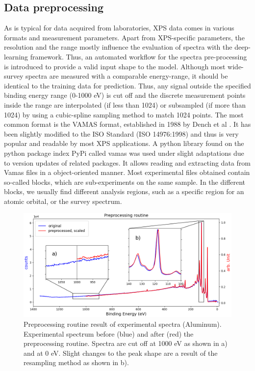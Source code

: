 \subsection{Data preprocessing}

As is typical for data acquired from laboratories, XPS data comes in various formats and measurement parameters. Apart from XPS-specific parameters, the resolution and the range mostly influence the evaluation of spectra with the deep-learning framework. Thus, an automated workflow for the spectra pre-processing is introduced to provide a valid input shape to the model.
Although most wide-survey spectra are measured with a comparable energy-range, it should be identical to the training data for prediction. Thus, any signal outside the specified binding energy range (0-1000 eV) is cut off and the discrete measurement points inside the range are interpolated (if less than 1024) or subsampled (if more than 1024) by using a cubic-spline sampling method to match 1024 points. The most common format is the VAMAS format, established in 1988 by Dench et al \cite{dench_vamas_1988}. It has been slightly modified to the ISO Standard \cite{1400-1700_iso_nodate}(ISO 14976:1998) and thus is very popular and readable by most XPS applications. A python library found on the python package index PyPi called vamas \cite{krinninger_vamas_nodate} was used under slight adaptations due to version updates of related packages. It allows reading and extracting data from Vamas files in a object-oriented manner.
Most experimental files obtained contain so-called blocks, which are sub-experiments on the same sample. In the different blocks, we usually find different analysis regions, such as a specific region for an atomic orbital, or the survey spectrum.

\begin{figure}
    \centering
    \includegraphics[width=\textwidth]{Figures/preprocessing_routine.png}
    \caption{Preprocessing routine result of experimental spectra (Aluminum). Experimental spectrum before (blue) and after (red) the preprocessing routine. Spectra are cut off at 1000 eV as shown in a) and at 0 eV. Slight changes to the peak shape are a result of the resampling method as shown in b).}
    \label{fig:preproc_routine}
\end{figure}

